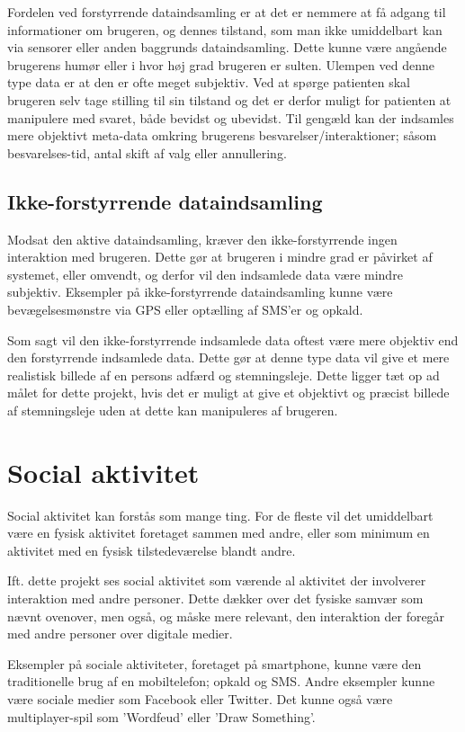 Fordelen ved forstyrrende dataindsamling er at det er nemmere at få adgang til informationer om brugeren, og dennes tilstand, som man ikke umiddelbart kan via sensorer eller anden baggrunds dataindsamling.
Dette kunne være angående brugerens humør eller i hvor høj grad brugeren er sulten.
Ulempen ved denne type data er at den er ofte meget subjektiv. 
Ved at spørge patienten skal brugeren selv tage stilling til sin tilstand og det er derfor muligt for patienten at manipulere med svaret, både bevidst og ubevidst.
Til gengæld kan der indsamles mere objektivt meta-data omkring brugerens besvarelser/interaktioner; såsom besvarelses-tid, antal skift af valg eller annullering.

\subsection{Ikke-forstyrrende dataindsamling}
Modsat den aktive dataindsamling, kræver den ikke-forstyrrende ingen interaktion med brugeren.
Dette gør at brugeren i mindre grad er påvirket af systemet, eller omvendt, og derfor vil den indsamlede data være mindre subjektiv.
Eksempler på ikke-forstyrrende dataindsamling kunne være bevægelsesmønstre via GPS eller optælling af SMS'er og opkald.

Som sagt vil den ikke-forstyrrende indsamlede data oftest være mere objektiv end den forstyrrende indsamlede data.
Dette gør at denne type data vil give et mere realistisk billede af en persons adfærd og stemningsleje.
Dette ligger tæt op ad målet for dette projekt, hvis det er muligt at give et objektivt og præcist billede af stemningsleje uden at dette kan manipuleres af brugeren.

\section{Social aktivitet}
Social aktivitet kan forstås som mange ting.
For de fleste vil det umiddelbart være en fysisk aktivitet foretaget sammen med andre, eller som minimum en aktivitet med en fysisk tilstedeværelse blandt andre.

Ift. dette projekt ses social aktivitet som værende al aktivitet der involverer interaktion med andre personer.
Dette dækker over det fysiske samvær som nævnt ovenover, men også, og måske mere relevant, den interaktion der foregår med andre personer over digitale medier.

Eksempler på sociale aktiviteter, foretaget på smartphone, kunne være den traditionelle brug af en mobiltelefon; opkald og SMS.
Andre eksempler kunne være sociale medier som Facebook eller Twitter.
Det kunne også være multiplayer-spil som 'Wordfeud' eller 'Draw Something'.

